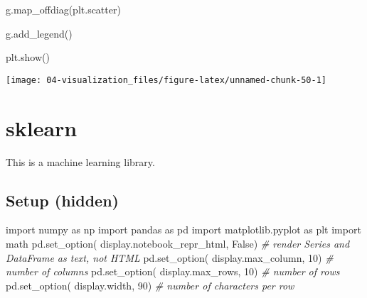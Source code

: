 \documentclass[
]{book}
\newenvironment{Shaded}{\begin{snugshade}}{\end{snugshade}}
\newcommand{\CommentTok}[1]{\textcolor[rgb]{0.37,0.37,0.37}{\textit{#1}}}
\newcommand{\DecValTok}[1]{\textcolor[rgb]{0.06,0.06,0.06}{#1}}
\newcommand{\ImportTok}[1]{#1}
\newcommand{\NormalTok}[1]{#1}
\newcommand{\StringTok}[1]{\textcolor[rgb]{0.5,0.5,0.5}{#1}}
\newcommand{\VariableTok}[1]{\textcolor[rgb]{0,0,0}{#1}}
\begin{document}
\begin{Shaded}
\begin{Highlighting}[]
\NormalTok{g.map\_offdiag(plt.scatter)}
\end{Highlighting}
\end{Shaded}

\begin{Shaded}
\begin{Highlighting}[]
\NormalTok{g.add\_legend()}
\end{Highlighting}
\end{Shaded}

\begin{Shaded}
\begin{Highlighting}[]
\NormalTok{plt.show()}
\end{Highlighting}
\end{Shaded}

\texttt{[image: 04-visualization\_files/figure-latex/unnamed-chunk-50-1]}

\hypertarget{sklearn}{%
\chapter{sklearn}\label{sklearn}}

This is a machine learning library.

\hypertarget{setup-hidden}{%
\section{Setup (hidden)}\label{setup-hidden}}

\begin{Shaded}
\begin{Highlighting}[]
\ImportTok{import}\NormalTok{ numpy }\ImportTok{as}\NormalTok{ np}
\ImportTok{import}\NormalTok{ pandas }\ImportTok{as}\NormalTok{ pd}
\ImportTok{import}\NormalTok{ matplotlib.pyplot }\ImportTok{as}\NormalTok{ plt}
\ImportTok{import}\NormalTok{ math}
\NormalTok{pd.set\_option( }\StringTok{\textquotesingle{}display.notebook\_repr\_html\textquotesingle{}}\NormalTok{, }\VariableTok{False}\NormalTok{)  }\CommentTok{\# render Series and DataFrame as text, not HTML}
\NormalTok{pd.set\_option( }\StringTok{\textquotesingle{}display.max\_column\textquotesingle{}}\NormalTok{, }\DecValTok{10}\NormalTok{)    }\CommentTok{\# number of columns}
\NormalTok{pd.set\_option( }\StringTok{\textquotesingle{}display.max\_rows\textquotesingle{}}\NormalTok{, }\DecValTok{10}\NormalTok{)     }\CommentTok{\# number of rows}
\NormalTok{pd.set\_option( }\StringTok{\textquotesingle{}display.width\textquotesingle{}}\NormalTok{, }\DecValTok{90}\NormalTok{)        }\CommentTok{\# number of characters per row}
\end{Highlighting}
\end{Shaded}
\end{document}
